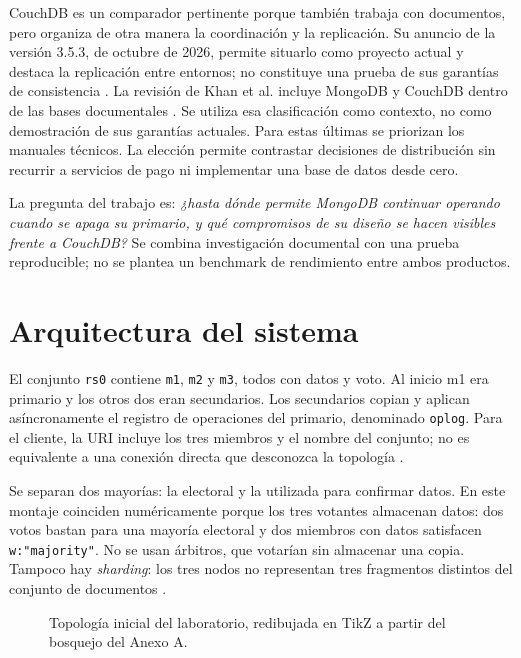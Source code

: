 CouchDB es un comparador pertinente porque también trabaja con documentos, pero organiza de otra manera la coordinación y la replicación. Su anuncio de la versión 3.5.3, de octubre de 2026, permite situarlo como proyecto actual y destaca la replicación entre entornos; no constituye una prueba de sus garantías de consistencia \cite{lehnardt2026couchdb353}. La revisión de Khan et al. incluye MongoDB y CouchDB dentro de las bases documentales \cite[p.~10]{KhanEtAl2023}. Se utiliza esa clasificación como contexto, no como demostración de sus garantías actuales. Para estas últimas se priorizan los manuales técnicos. La elección permite contrastar decisiones de distribución sin recurrir a servicios de pago ni implementar una base de datos desde cero.

La pregunta del trabajo es: \textit{¿hasta dónde permite MongoDB continuar operando cuando se apaga su primario, y qué compromisos de su diseño se hacen visibles frente a CouchDB?} Se combina investigación documental con una prueba reproducible; no se plantea un benchmark de rendimiento entre ambos productos.

\section{Arquitectura del sistema}
El conjunto \texttt{rs0} contiene \texttt{m1}, \texttt{m2} y \texttt{m3}, todos con datos y voto. Al inicio m1 era primario y los otros dos eran secundarios. Los secundarios copian y aplican asíncronamente el registro de operaciones del primario, denominado \texttt{oplog}. Para el cliente, la URI incluye los tres miembros y el nombre del conjunto; no es equivalente a una conexión directa que desconozca la topología \cite{MongoReplication}.

Se separan dos mayorías: la electoral y la utilizada para confirmar datos. En este montaje coinciden numéricamente porque los tres votantes almacenan datos: dos votos bastan para una mayoría electoral y dos miembros con datos satisfacen \texttt{w:"majority"}. No se usan árbitros, que votarían sin almacenar una copia. Tampoco hay \textit{sharding}: los tres nodos no representan tres fragmentos distintos del conjunto de documentos \cite{MongoElections,MongoWriteConcern}.

\begin{figure}[H]
\centering

\caption{Topología inicial del laboratorio, redibujada en TikZ a partir del bosquejo del Anexo A.}
\label{fig:arquitectura}
\end{figure}

